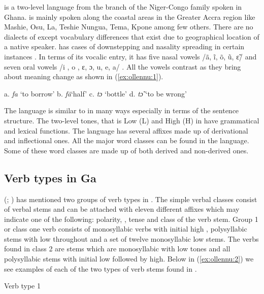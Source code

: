 \documentclass[output=paper
,newtxmath
,modfonts
,nonflat]{langsci/langscibook}
\begin{document}
 is a two-level  language from the  branch of the Niger-Congo family spoken in Ghana.  is mainly spoken along the coastal areas in the Greater Accra region like  Mashie, Osu, La, Teshie Nungua, Tema, Kpone among few others. There are no dialects of  except vocabulary differences that exist due to geographical location of a native speaker.  has cases of downstepping and nasality spreading in certain instances \citet{Dakubu2000}. In terms of its vocalic entry, it has five nasal vowels /ã, ĩ, õ, ũ, ɛ̃/ and seven oral vowels /i , o , ɛ, ɔ, u, e, a/ . All the vowels contrast as they bring about meaning change as shown in (\ref{ex:ollennu:1}).

\ea \label{ex:ollennu:1} a. \textit{fa} \enspace `to borrow'  \enspace b. \textit{fã}\enspace `half' \enspace c. \textit{tɔ} \enspace `bottle' \enspace d. \textit{tɔ̃} \enspace `to be wrong'
\z


The language is similar to  in many ways especially in terms of the sentence structure. The two-level tones, that is Low (L) and High (H) in  have grammatical and lexical functions. The language has several affixes made up of derivational and inflectional ones. All the major word classes can be found in the language. Some of these word classes are made up of both derived and non-derived ones.

\subsection{\label{sec:ollennu:1.2} Verb types in Ga}

\citeauthor{Dakubu1970}  (\citeyear{Dakubu1970}; \citeyear{Dakubu2003}) has mentioned two groups of verb types in . The simple verbal classes consist of verbal stems and can be attached with eleven different affixes which may indicate one of the following: polarity, , tense and class of the verb stem. Group 1 or class one verb consists of monosyllabic verbs with initial high , polysyllabic stems with low  throughout and a set of twelve monosyllabic low  stems. The verbs found in class 2 are stems which are monosyllabic with low tones and all polysyllabic stems with initial low  followed by high. Below in (\ref{ex:ollennu:2}) we see examples of each of the two types of verb stems found in .

\medskip
Verb type 1
\medskip
\end{document}
